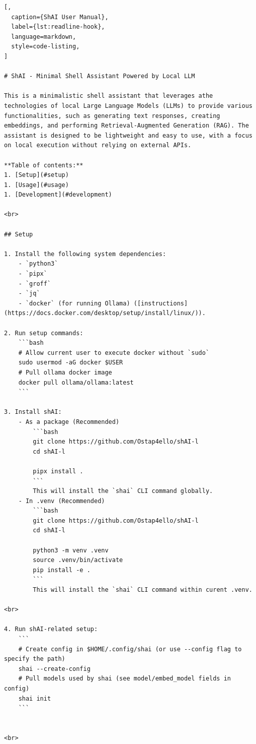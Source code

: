 
\begin{lstlisting}[,
  caption={ShAI User Manual},
  label={lst:readline-hook},
  language=markdown,
  style=code-listing,
]

# ShAI - Minimal Shell Assistant Powered by Local LLM

This is a minimalistic shell assistant that leverages athe technologies of local Large Language Models (LLMs) to provide various functionalities, such as generating text responses, creating embeddings, and performing Retrieval-Augmented Generation (RAG). The assistant is designed to be lightweight and easy to use, with a focus on local execution without relying on external APIs.

**Table of contents:**
1. [Setup](#setup)
1. [Usage](#usage)
1. [Development](#development)

<br>

## Setup

1. Install the following system dependencies:
    - `python3`
    - `pipx`
    - `groff`
    - `jq`
    - `docker` (for running Ollama) ([instructions](https://docs.docker.com/desktop/setup/install/linux/)).

2. Run setup commands:
    ```bash
    # Allow current user to execute docker without `sudo`
    sudo usermod -aG docker $USER
    # Pull ollama docker image
    docker pull ollama/ollama:latest
    ```

3. Install shAI:
    - As a package (Recommended)
        ```bash
        git clone https://github.com/Ostap4ello/shAI-l
        cd shAI-l

        pipx install .
        ```
        This will install the `shai` CLI command globally.
    - In .venv (Recommended)
        ```bash
        git clone https://github.com/Ostap4ello/shAI-l
        cd shAI-l

        python3 -m venv .venv
        source .venv/bin/activate
        pip install -e .
        ```
        This will install the `shai` CLI command within curent .venv.

<br>

4. Run shAI-related setup:
    ```
    # Create config in $HOME/.config/shai (or use --config flag to specify the path)
    shai --create-config
    # Pull models used by shai (see model/embed_model fields in config)
    shai init
    ```


<br>


\end{lstlisting}
